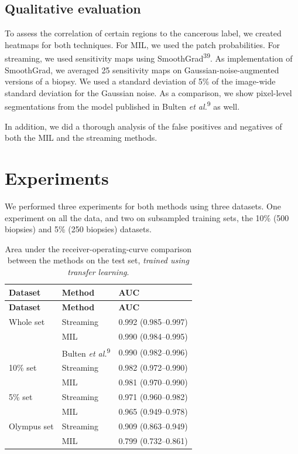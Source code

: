 \documentclass[
  12pt,
  a5,margin=2cmpaper,
]{article}
\begin{document}
\hypertarget{qualitative-evaluation}{%
\subsection{Qualitative evaluation}\label{qualitative-evaluation}}

To assess the correlation of certain regions to the cancerous label, we
created heatmaps for both techniques. For MIL, we used the patch
probabilities. For streaming, we used sensitivity maps using
SmoothGrad\textsuperscript{39}. As implementation of SmoothGrad, we
averaged 25 sensitivity maps on Gaussian-noise-augmented versions of a
biopsy. We used a standard deviation of 5\% of the image-wide standard
deviation for the Gaussian noise. As a comparison, we show pixel-level
segmentations from the model published in Bulten \emph{et
al.}\textsuperscript{9} as well.

In addition, we did a thorough analysis of the false positives and
negatives of both the MIL and the streaming methods.

\hypertarget{experiments}{%
\section{Experiments}\label{experiments}}

We performed three experiments for both methods using three datasets.
One experiment on all the data, and two on subsampled training sets, the
10\% (500 biopsies) and 5\% (250 biopsies) datasets.

\hypertarget{tab:test_results}{}
\begin{longtable}[]{@{}lll@{}}
\caption{Area under the receiver-operating-curve comparison between the
methods on the test set, \emph{trained using transfer
learning}.}\tabularnewline
\toprule\noalign{}
\textbf{Dataset} & \textbf{Method} & \textbf{AUC} \\
\midrule\noalign{}
\endfirsthead
\toprule\noalign{}
\textbf{Dataset} & \textbf{Method} & \textbf{AUC} \\
\midrule\noalign{}
\endhead
\bottomrule\noalign{}
\endlastfoot
Whole set & Streaming & 0.992 (0.985--0.997) \\
& MIL & 0.990 (0.984--0.995) \\
& Bulten \emph{et al.}\textsuperscript{9} & 0.990 (0.982--0.996) \\
10\% set & Streaming & 0.982 (0.972--0.990) \\
& MIL & 0.981 (0.970--0.990) \\
5\% set & Streaming & 0.971 (0.960--0.982) \\
& MIL & 0.965 (0.949--0.978) \\
Olympus set & Streaming & 0.909 (0.863--0.949) \\
& MIL & 0.799 (0.732--0.861) \\
\end{longtable}
\end{document}
